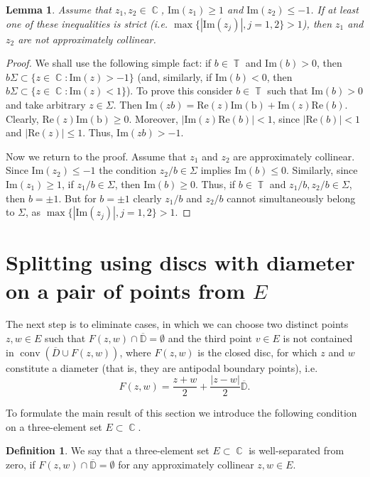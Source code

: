 \documentclass{amsart}
\numberwithin{equation}{section}
\newtheorem{lemma}[theorem]{Lemma}
\theoremstyle{definition}
\newtheorem{definition}[theorem]{Definition}
\theoremstyle{remark}
\DeclareMathOperator{\conv}{conv}
\DeclareMathOperator{\CC}{\mathbb C}
\DeclareMathOperator{\TT}{\mathbb T}
\begin{document}
	\begin{lemma}\label{lemIfLargeImaginaryOppositeSignsThenNotApprox}
		Assume that $z_1, z_2 \in \CC$, $\mathrm{Im}(z_1) \ge 1$ and $\mathrm{Im}(z_2) \le -1$. If at least one of these inequalities is strict (i.e. $\max\{|\mathrm{Im}(z_j)|, j = 1,2\} > 1$), then $z_1$ and $z_2$ are not approximately collinear.
	\end{lemma}
	\begin{proof}
		We shall use the following simple fact: if $b \in \TT$ and $\mathrm{Im}(b) > 0$, then $b\Sigma \subset \{z \in \CC: \mathrm{Im}(z) > -1\}$ (and, similarly, if $\mathrm{Im}(b) < 0$, then $b\Sigma \subset \{z \in \CC: \mathrm{Im}(z) < 1\}$). To prove this consider $b \in \TT$ such that $\mathrm{Im}(b) > 0$ and take arbitrary $z \in \Sigma$. Then $\mathrm{Im}(zb) = \mathrm{Re}(z)\mathrm{Im(b)} + \mathrm{Im}(z)\mathrm{Re}(b)$. Clearly, $\mathrm{Re}(z)\mathrm{Im(b)} \ge 0$. Moreover, $|\mathrm{Im}(z)\mathrm{Re}(b)| < 1$, since $|\mathrm{Re}(b)| < 1$ and $|\mathrm{Re}(z)| \le 1$. Thus, $\mathrm{Im}(zb) > -1$. 
		
		Now we return to the proof. Assume that $z_1$ and $z_2$ are approximately collinear. Since $\mathrm{Im}(z_2) \le -1$ the condition $z_2/b \in \Sigma$ implies $\mathrm{Im}(b) \le 0$. Similarly, since $\mathrm{Im}(z_1) \ge 1$, if $z_1/b \in \Sigma$, then $\mathrm{Im}(b) \ge 0$. Thus, if $b \in \TT$ and $z_1/b, z_2/b \in \Sigma$, then $b = \pm 1$. But for $b = \pm 1$ clearly $z_1/b$ and $z_2/b$ cannot simultaneously belong to $\Sigma$, as $\max\{|\mathrm{Im}(z_j)|, j = 1,2\} > 1$.
	\end{proof}
	
	\section{Splitting using discs with diameter on a pair of points from \texorpdfstring{$E$}{E}}\label{sec:Diameters}	
	
	The next step is to eliminate cases, in which we can choose two distinct points $z, w \in E$ such that $F(z,w) \cap \overline{\mathbb D} = \emptyset$ and the third point $v \in E$ is not contained in $\conv(\overline{D} \cup F(z,w))$, where $F(z,w)$ is the closed disc, for which $z$ and $w$ constitute a diameter (that is, they are antipodal boundary points), i.e.
	\[
	F(z,w) = \dfrac{z+ w}{2} + \dfrac{|z - w|}{2} \overline{\mathbb D}.
	\]
	
	To formulate the main result of this section we introduce the following condition on a three-element set $E \subset \CC$.
	\begin{definition}
		We say that a three-element set $E \subset \CC$ is well-separated from zero, if $F(z,w) \cap \overline{\mathbb D} = \emptyset$ for any approximately collinear $z,w \in E$.
	\end{definition}
	
\end{document}
